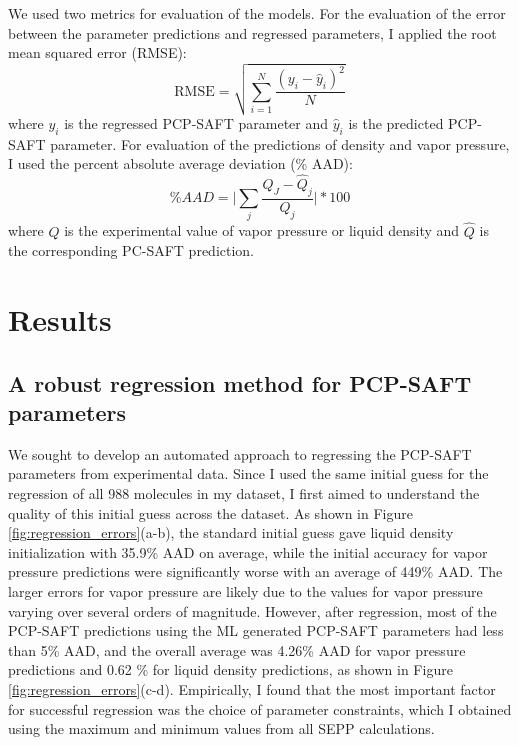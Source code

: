 We used two metrics for evaluation of the models. For the evaluation of the error between the parameter predictions and regressed parameters, I applied the root mean squared error (RMSE):
\begin{equation}
    \text{RMSE} = \sqrt{\sum_{i=1}^N \frac{(y_i - \hat y_i)^2}{N}}
\end{equation}
where $y_i$ is the regressed PCP-SAFT parameter and $\hat y_i$ is the predicted PCP-SAFT parameter. For evaluation of the predictions of density and vapor pressure, I used the percent absolute average deviation (\% AAD):
\begin{equation}
    \% AAD = \biggl \vert \sum_j\frac{Q_J - \hat Q_j}{Q_j} \biggr \vert * 100
\end{equation}
where $Q$ is the experimental value of vapor pressure or liquid density and $\hat Q$ is the corresponding PC-SAFT prediction.


\section{Results}

\subsection{A robust regression method for PCP-SAFT parameters}

We sought to develop an automated approach to regressing the PCP-SAFT parameters from experimental data. Since I used the same initial guess for the regression of all 988 molecules in my dataset, I first aimed to understand the quality of this initial guess across the dataset. As shown in Figure \ref{fig:regression_errors}(a-b), the standard initial guess gave liquid density initialization with 35.9\% AAD on average, while the initial accuracy for vapor pressure predictions were significantly worse with an average of 449\% AAD. The larger errors for vapor pressure are likely due to the values for vapor pressure varying over several orders of magnitude. However, after regression, most of the PCP-SAFT predictions using the ML generated PCP-SAFT parameters had less than 5\% AAD, and the overall average was 4.26\% AAD for vapor pressure predictions and 0.62 \% for liquid density predictions, as shown in Figure \ref{fig:regression_errors}(c-d). Empirically, I found that the most important factor for successful regression was the choice of parameter constraints, which I obtained using the maximum and minimum values from all SEPP calculations.

